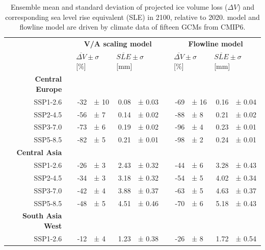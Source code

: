       \begin{table}[htp]
        \centering
        \small

        \caption{Ensemble mean and standard deviation of projected ice volume loss ($\Delta V$) and corresponding sea level rise equivalent (SLE) in 2100, relative to 2020. \Vas{} model and flowline model are driven by climate data of fifteen GCMs from CMIP6.}
        \label{tab:cmip}

        \begin{tabular}{@{}rlrlrllrlrl@{}}
          \toprule
          {} & \phantom{a} & \multicolumn{4}{c}{\textbf{V/A scaling model}} & \phantom{a} & \multicolumn{4}{c}{\textbf{Flowline model}} \\
          {} & \phantom{a} & \multicolumn{2}{l}{$\overline{\Delta V} \pm \sigma$ [\si{\percent}]} & \multicolumn{2}{l}{$\overline{SLE} \pm \sigma$ [\si{\milli\meter}]} & \phantom{a} & \multicolumn{2}{l}{$\overline{\Delta V} \pm \sigma$ [\si{\percent}]} & \multicolumn{2}{l}{$\overline{SLE} \pm \sigma$ [\si{\milli\meter}]} \\
          \midrule
          \textbf{Central Europe}\\
          SSP1-2.6 & \phantom{a} & -32 & ± 10 & 0.08 & ± 0.03 & \phantom{a} & -69 & ± 16 & 0.16 & ± 0.04\\
          SSP2-4.5 & \phantom{a} & -56 & ± 7 & 0.14 & ± 0.02 & \phantom{a} & -88 & ± 8 & 0.21 & ± 0.02\\
          SSP3-7.0 & \phantom{a} & -73 & ± 6 & 0.19 & ± 0.02 & \phantom{a} & -96 & ± 4 & 0.23 & ± 0.01\\
          SSP5-8.5 & \phantom{a} & -82 & ± 5 & 0.21 & ± 0.01 & \phantom{a} & -98 & ± 2 & 0.24 & ± 0.01\\
          \textbf{Central Asia}\\
          SSP1-2.6 & \phantom{a} & -26 & ± 3 & 2.43 & ± 0.32 & \phantom{a} & -44 & ± 6 & 3.28 & ± 0.43\\
          SSP2-4.5 & \phantom{a} & -34 & ± 3 & 3.18 & ± 0.32 & \phantom{a} & -54 & ± 5 & 4.02 & ± 0.34\\
          SSP3-7.0 & \phantom{a} & -42 & ± 4 & 3.88 & ± 0.37 & \phantom{a} & -63 & ± 5 & 4.63 & ± 0.37\\
          SSP5-8.5 & \phantom{a} & -48 & ± 5 & 4.51 & ± 0.46 & \phantom{a} & -70 & ± 6 & 5.18 & ± 0.43\\
          \textbf{South Asia West}\\
          SSP1-2.6 & \phantom{a} & -12 & ± 4 & 1.23 & ± 0.38 & \phantom{a} & -26 & ± 8 & 1.72 & ± 0.54\\

\end{tabular}
\end{table}
